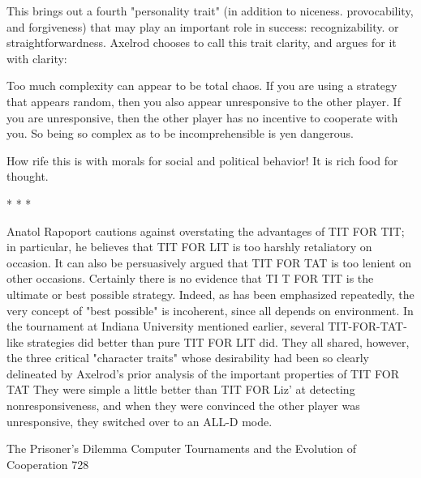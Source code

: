 This brings out a fourth "personality trait" (in addition to niceness. provocability, and
forgiveness) that may play an important role in success: recognizability. or
straightforwardness. Axelrod chooses to call this trait clarity, and argues for it with
clarity:

       Too much complexity can appear to be total chaos. If you are using a strategy that
appears random, then you also appear unresponsive to the other player. If you are
unresponsive, then the other player has no incentive to cooperate with you. So being so
complex as to be incomprehensible is yen dangerous.

       How rife this is with morals for social and political behavior! It is rich food for
thought.

                                             * *    *

         Anatol Rapoport cautions against overstating the advantages of TIT FOR TIT; in
particular, he believes that TIT FOR LIT is too harshly retaliatory on occasion. It can also
be persuasively argued that TIT FOR TAT is too lenient on other occasions. Certainly
there is no evidence that TI T FOR TIT is the ultimate or best possible strategy. Indeed,
as has been emphasized repeatedly, the very concept of "best possible" is incoherent,
since all depends on environment. In the tournament at Indiana University mentioned
earlier, several TIT-FOR-TAT- like strategies did better than pure TIT FOR LIT did.
They all shared, however, the three critical "character traits" whose desirability had been
so clearly delineated by Axelrod's prior analysis of the important properties of TIT FOR
TAT They were simple a little better than TIT FOR Liz' at detecting nonresponsiveness,
and when they were convinced the other player was unresponsive, they switched over to
an ALL-D mode.




The Prisoner's Dilemma Computer Tournaments and the Evolution of Cooperation            728

